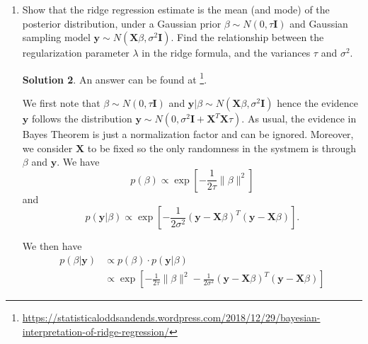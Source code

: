 \documentclass[]{book}
\theoremstyle{definition}
\newtheorem*{soln}{Solution}
\newcommand{\XX}{\mathbf{X}} \newcommand{\YY}{\mathbf{Y}}
\newcommand{\yy}{\mathbf{y}}
\newcommand{\II}{\mathbf{I}}
\begin{document}
\begin{enumerate}
\begin{soln}
		This idea generalizes to $p$ dimensions. As a result, Ridge regression 
		both with and without centering gives us the same prediction $\beta_j$,
		albeit with a possibly different $\beta_0$.

		Observe that the above analysis \emph{assumes} that the true model is indeed 
		linear.

		A similar result holds for any other penalty function that does not take
		into account the intercept $\beta_0$, hence also for Lasso.
	\end{soln}

	\item\label{ex:3.6} Show that the ridge regression estimate is the mean 
	(and mode) of the posterior distribution, under a Gaussian prior
	$\beta\sim N(0,\tau\II)$ and Gaussian sampling model 
	$\yy\sim N(\XX\beta,\sigma^2\II)$. Find the relationship between the 
	regularization parameter $\lambda$ in the ridge formula, and the variances 
	$\tau$ and $\sigma^2$.

	\begin{soln}
		An answer can be found at
		\footnote[1]
		{\url{https://statisticaloddsandends.wordpress.com/2018/12/29/bayesian-interpretation-of-ridge-regression/}}.

		We first note that
		$\beta\sim N(0,\tau\II)$ and
		$\yy|\beta\sim N(\XX\beta,\sigma^2\II)$ hence the evidence $\yy$
		follows the distribution $\yy\sim N(0,\sigma^2\II+\XX^T\XX\tau)$.
		As usual, the evidence in Bayes Theorem is just a normalization factor 
		and can be ignored. Moreover, we consider $\XX$ to be fixed so the 
		only randomness in the systmem is through $\beta$ and $\yy$. We have 
		\[p(\beta)\varpropto \exp\left[-\frac{1}{2\tau}\|\beta\|^2\right]\]
		and
		\[p(\yy|\beta)\varpropto \exp\left[-\frac{1}{2\sigma^2}(\yy-\XX\beta)^T(\yy-\XX\beta)\right].\]

		We then have
		\begin{equation}
			\begin{split}
				p(\beta|\yy) & \varpropto p(\beta)\cdot p(\yy|\beta) \\
				&\varpropto \exp\left[-\frac{1}{2\tau}\|\beta\|^2-\frac{1}{2\sigma^2}(\yy-\XX\beta)^T(\yy-\XX\beta)\right]
			\end{split}
		\end{equation}


\end{soln}
\end{enumerate}
\end{document}
